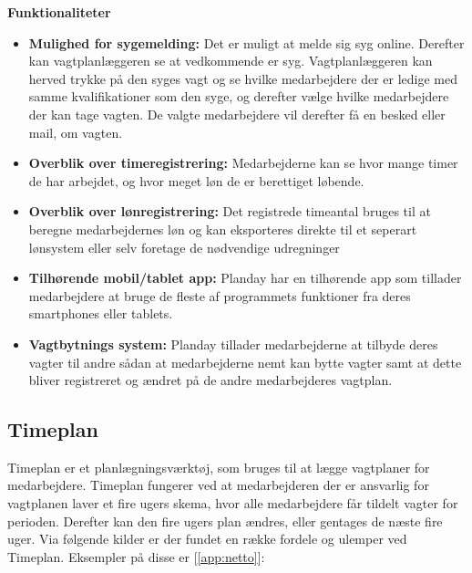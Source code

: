 \noindent\textbf{Funktionaliteter}
\begin{itemize}
\item {\textbf{Mulighed for sygemelding:} Det er muligt at melde sig syg online. Derefter kan vagtplanlæggeren se at vedkommende er syg. Vagtplanlæggeren kan herved trykke på den syges vagt og se hvilke medarbejdere der er ledige med samme kvalifikationer som den syge, og derefter vælge hvilke medarbejdere der kan tage vagten. De valgte medarbejdere vil derefter få en besked eller mail, om vagten.}
\item {\textbf{Overblik over timeregistrering:} Medarbejderne kan se hvor mange timer de har arbejdet, og hvor meget løn de er berettiget løbende.}
\item{\textbf{Overblik over lønregistrering:} Det registrede timeantal bruges til at beregne medarbejdernes løn og kan eksporteres direkte til et seperart lønsystem eller selv foretage de nødvendige udregninger}
\item{\textbf{Tilhørende mobil/tablet app:} Planday har en tilhørende app som tillader medarbejdere at bruge de fleste af programmets funktioner fra deres smartphones eller tablets.}
\item{\textbf{Vagtbytnings system:} Planday tillader medarbejderne at tilbyde deres vagter til andre sådan at medarbejderne nemt kan bytte vagter samt at dette bliver registreret og ændret på de andre medarbejderes vagtplan.}
\end{itemize} 


\subsection{Timeplan}
Timeplan er et planlægningsværktøj, som bruges til at lægge vagtplaner for medarbejdere. Timeplan fungerer ved at medarbejderen der er ansvarlig for vagtplanen laver et fire ugers skema, hvor alle medarbejdere får tildelt vagter for perioden. Derefter kan den fire ugers plan ændres, eller gentages de næste fire uger. Via følgende kilder er der fundet en række fordele og ulemper ved Timeplan. Eksempler på disse er \citep{timeplan} [\ref{app:netto}]:

